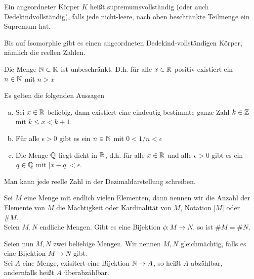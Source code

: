     \begin{defn}
        Ein angeordneter Körper $K$ heißt supremumsvollständig (oder auch Dedekindvollständig), falls jede nicht-leere, nach oben beschränkte Teilmenge ein Supremum hat.
    \end{defn}
    \begin{bem}
        Bis auf Isomorphie gibt es einen angeordneten Dedekind-vollständigen Körper, nämlich die reellen Zahlen. 
    \end{bem}
    \begin{satz} Die Menge $\mathbb{N}\subset \mathbb{R}$ ist unbeschränkt. D.h. für alle $x\in \mathbb{R}$ positiv existiert ein $n\in \mathbb{N}$ mit $n> x$
    \end{satz}
    \begin{lemma}Es gelten die folgenden Aussagen 
        \begin{enumerate}[(a)]
            \item Sei $x\in \mathbb{R}$ beliebig, dann existiert eine eindeutig bestimmte ganze Zahl $k\in \mathbb{Z}$ mit $k\le x < k+1$.
            \item Für alle $\epsilon >0$ gibt es ein $n\in \mathbb{N}$ mit $0<1/n < \epsilon$
            \item Die Menge $\mathbb{Q}$ liegt dicht in $\mathbb{R}$, d.h. für alle $x\in \mathbb{R}$ und alle $\epsilon >0$ gibt es ein $q\in \mathbb{Q}$ mit $\vert x-q\vert <\epsilon$.
        \end{enumerate}
    \end{lemma}
    \begin{bem}
        Man kann jede reelle Zahl in der Dezimaldarstellung schreiben. 
    \end{bem}
    \begin{defn}
        Sei $M$ eine Menge mit endlich vielen Elementen, dann nennen wir die Anzahl
        der Elemente von $M$ die Mächtigkeit oder Kardinalität von $M$, Notation $\vert M\vert$ oder $\# M$.\\
        Seien $M,N$ endliche Mengen. Gibt es eine Bijektion $\phi:M\to N$, so ist $\# M =\# N$.
    \end{defn}
    \begin{defn}
        Seien nun $M,N$ zwei beliebige Mengen. Wir nennen $M,N$ gleichmächtig, falls es eine Bijektion $M\to N$ gibt. \\
        Sei $A$ eine Menge, exisitert eine Bijektion $\mathbb{N}\to A$, so heißt $A$ abzählbar, andernfalls heißt $A$ überabzählbar.
    \end{defn}
